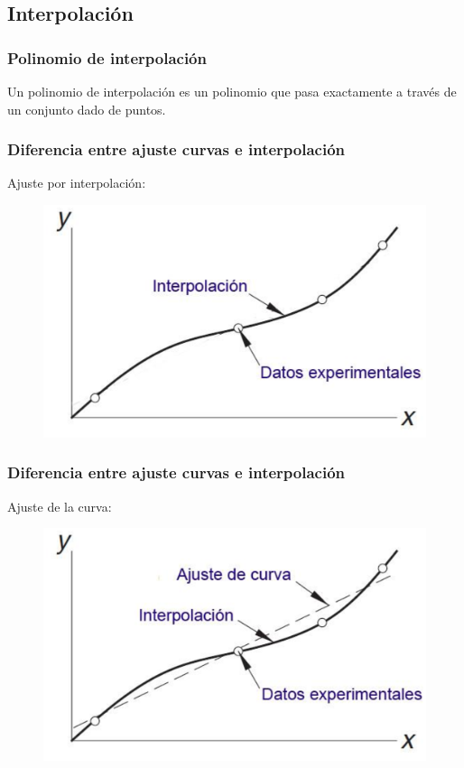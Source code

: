 \subsection{Interpolación}
\begin{frame}
\frametitle{Polinomio de interpolación}
Un polinomio de interpolación es un polinomio que pasa exactamente a través de un conjunto dado de puntos.
\end{frame}
\begin{frame}
\frametitle{Diferencia entre ajuste curvas e interpolación}
Ajuste por interpolación:
\begin{figure}
   \centering
   \includegraphics[scale=0.5]{Imagenes/Interpol02.eps}
\end{figure}
\end{frame}
\begin{frame}
\frametitle{Diferencia entre ajuste curvas e interpolación}
Ajuste de la curva:
\begin{figure}
   \centering
   \includegraphics[scale=0.5]{Imagenes/Interpol03.eps}
\end{figure}
\end{frame}
